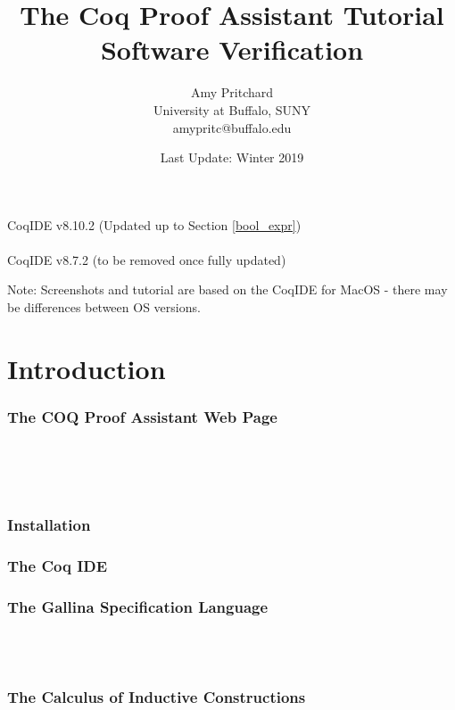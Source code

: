 \documentclass{article}
\title{\textbf{The Coq Proof Assistant Tutorial} 
	\\ Software Verification}
\author{Amy Pritchard 
	\\ University at Buffalo, SUNY
	\\ amypritc@buffalo.edu}
\date{Last Update: Winter 2019}
\begin{document}
\maketitle

\begin{center}
	CoqIDE v8.10.2 (Updated up to Section \ref{bool_expr})
\\~\\
	CoqIDE v8.7.2 (to be removed once fully updated)
\end{center}

\vfill
\noindent
{\footnotesize Note: Screenshots and tutorial are based on the CoqIDE for MacOS - there may be differences between OS versions. }

\newpage
\tableofcontents


\newpage
\part{Introduction}
	\label{Part: intro}
\section{The COQ Proof Assistant Web Page} 
	\label{Sec: webpage}
	

~\\~\\~\\
\section{Installation} 
	\label{Sec: installation}
	 


\newpage
\section{The Coq IDE} 
	\label{Sec: ide}
	

\newpage
\section{The Gallina Specification Language}
	\label{Sec: gallina}
	
	
~\\~\\
\section{The Calculus of Inductive Constructions}
	\label{Sec: calculus}
	
	
\end{document}
